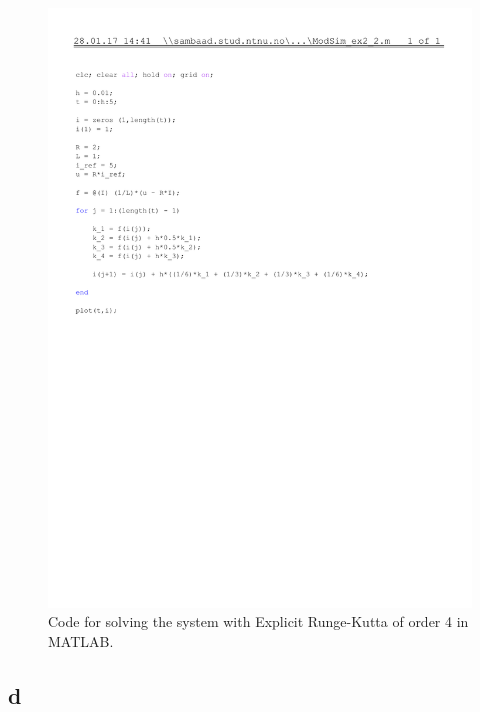 \documentclass{article}
\begin{document}
\begin{figure}[!ht]
    \centering
    \includegraphics[width = \textwidth]{ex2_2_RK4}
    \caption{Code for solving the system with Explicit Runge-Kutta of order 4 in MATLAB.}
    \label{fig:matlabcode} 
\end{figure}

\subsection{d}
\end{document}

